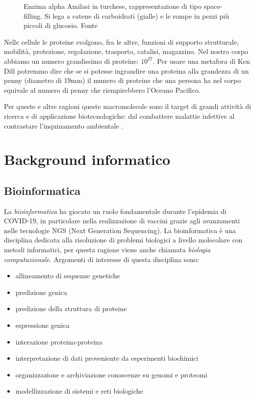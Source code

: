 \begin{figure}[!htb]
	\caption{Enzima alpha Amilasi in turchese, rappresentazione di tipo space-filling. Si lega a catene di carboidrati (gialle) e le rompe in pezzi più piccoli di glucosio. Fonte \cite{ProteinRCSB}}
	\label{fig:amilasi}
	\endminipage\hfill
\end{figure}


Nelle cellule le proteine svolgono, fra le altre, funzioni di supporto strutturale, mobilità, protezione, regolazione, trasporto, catalisi, magazzino. Nel nostro corpo abbiamo un numero grandissimo di proteine: $10^{27}$. Per usare una metafora di Ken Dill \supercite{TalksDill2013Oct} potremmo dire che se si potesse ingrandire una proteina alla grandezza di un penny (diametro di 19mm) il numero di proteine che una persona ha nel corpo equivale al numero di penny che riempirebbero l'Oceano Pacifico.

\par Per queste e altre ragioni queste macromolecole sono il target di grandi attività di ricerca e di applicazione biotecnologiche: dal combattere malattie infettive \supercite{batool2019structure} al contrastare l'inquinamento ambientale \supercite{knott2020characterization}.

\section{Background informatico}

\subsection{Bioinformatica}

La \textit{bioinformatica} ha giocato un ruolo fondamentale durante l'epidemia di COVID-19, in particolare nella realizzazione di vaccini grazie agli avanzamenti nelle tecnologie NGS (Next Generation Sequencing). La bioinformatica è una disciplina dedicata alla risoluzione di problemi biologici a livello molecolare con metodi informatici, per questa ragione viene anche chiamata \textit{biologia computazionale}. Argomenti di interesse di questa disciplina sono:
\begin{itemize}
	\item allineamento di sequenze genetiche
	\item predizione genica
	\item predizione della struttura di proteine
	\item espressione genica
	\item interazione proteina-proteina
	\item interpretazione di dati proveniente da esperimenti biochimici
	\item organizzazione e archiviazione conoscenze su genomi e proteomi
	\item modellizzazione di sistemi e reti biologiche
\end{itemize}

